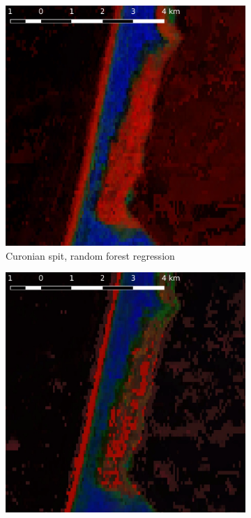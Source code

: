 \documentclass[a4paper,12pt]{scrbook}
\begin{document}
\begin{figure}
\begin{subfigure}[t]{.24\textwidth}
    \includegraphics[width=\textwidth]{thesis-figures/figures-qgis/kursiunerija-rf}
    \caption{Curonian spit, random forest regression}
    \label{subfig-kursiunerija-rf}
  \end{subfigure} \hfill
  \begin{subfigure}[t]{.24\textwidth}
    \includegraphics[width=\textwidth]{thesis-figures/figures-qgis/kursiunerija-nn}

\end{subfigure}
\end{figure}
\end{document}
